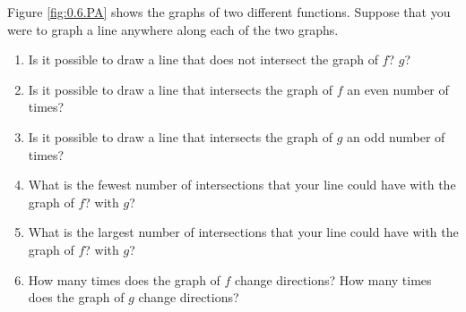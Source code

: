 \begin{pa} \label{PA:0.6}
    
Figure \ref{fig:0.6.PA} shows the graphs of two different functions.  Suppose that you were to graph a line anywhere along each of the two graphs.

\begin{enumerate}
	\item Is it possible to draw a line that does not intersect the graph of $f$? $g$?
	\item Is it possible to draw a line that intersects the graph of $f$ an even number of times?
	\item Is it possible to draw a line that intersects the graph of $g$ an odd number of times?
	\item What is the fewest number of intersections that your line could have with the graph of $f$? with $g$?
	\item What is the largest number of intersections that your line could have with the graph of $f$? with $g$?
	\item How many times does the graph of $f$ change directions? How many times does the graph of $g$ change directions?
\end{enumerate}


\end{pa}
